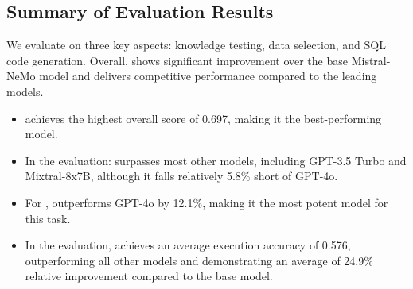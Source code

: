 \subsection{Summary of Evaluation Results}
We evaluate \modelname on three key aspects: knowledge testing, data selection, and SQL code generation. Overall, \modelname shows significant improvement over the base Mistral-NeMo model and delivers competitive performance compared to the leading models.
\begin{itemize}
    \item \modelname achieves the highest overall score of 0.697, making it the best-performing model.
    \item In the \mmlu evaluation: \modelname surpasses most other models, including GPT-3.5 Turbo and Mixtral-8x7B, although it falls relatively 5.8\% short of GPT-4o.
    \item For \datadiscovery, \modelname outperforms GPT-4o by 12.1\%, making it the most potent model for this task. 
    \item   In the \texttosql evaluation, \modelname achieves an average execution accuracy of 0.576, outperforming all other models and demonstrating an average of 24.9\% relative improvement compared to the base model.
\end{itemize}

